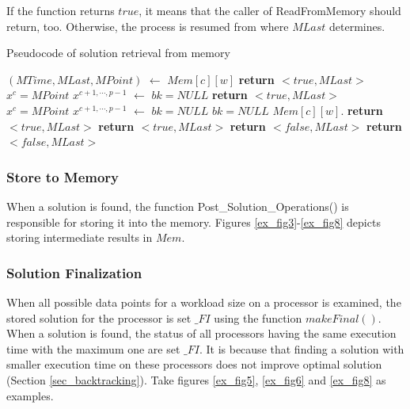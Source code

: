 \documentclass[12pt]{article}
\begin{document}
If the function returns $true$, it means that the caller of ReadFromMemory should return, too. Otherwise, the process is resumed from where $MLast$ determines.

\begin{algorithm}
\scriptsize
\caption{Pseudocode of solution retrieval from memory} \label{alg3_code}
\begin{algorithmic}[1]	
	\State $(MTime, MLast, MPoint)$ $\gets$ $Mem[c][w]$ \label{alg3_memAcc}
			\label{alg3_noSol_1}		
			\State \textbf{return $<true,MLast>$}	\label{alg3_noSol_2}
		\Else						\label{alg3_fsol_1}
				\State $x^c = MPoint$
				\State $x^{c+1,\cdots,p-1}$ $\gets$ 
				\State {}
					\State $bk = NULL$
				\EndIf					
			\EndIf
			\State \textbf{return $<true,MLast>$}	
		\EndIf						\label{alg3_fsol_2}
			\label{alg3_sol_1}
			\State $x^c = MPoint$	
			\State $x^{c+1,\cdots,p-1}$ $\gets$ 
			\State {}
				\State $bk = NULL$
				\State $bk = NULL$
				\State $Mem[c][w].$
				\State \textbf{return $<true,MLast>$}
			\Else
				\State \textbf{return $<true,MLast>$}
			\EndIf				
		\EndIf								\label{alg3_sol_2}
			\label{alg3_resume_1}
			\State \textbf{return $<false,MLast>$}	
		\EndIf						        \label{alg3_resume_2}
	\EndIf
	\State \textbf{return $<false,MLast>$}
\EndFunction		
\end{algorithmic}
\end{algorithm}

\subsubsection{Store to Memory}
When a solution is found, the function Post\_Solution\_Operations() is responsible for storing it into the memory. Figures \ref{ex_fig3}-\ref{ex_fig8} depicts storing intermediate results in $Mem$. 

\subsubsection{Solution Finalization}
When all possible data points for a workload size on a processor is examined, the stored solution for the processor is set $\_FI$ using the function $makeFinal()$. When a solution is found, the status of all processors having the same execution time with the maximum one are set $\_FI$. It is because that finding a solution with smaller execution time on these processors does not improve optimal solution (Section \ref{sec_backtracking}). Take figures \ref{ex_fig5}, \ref{ex_fig6} and \ref{ex_fig8} as examples.
\end{document}
